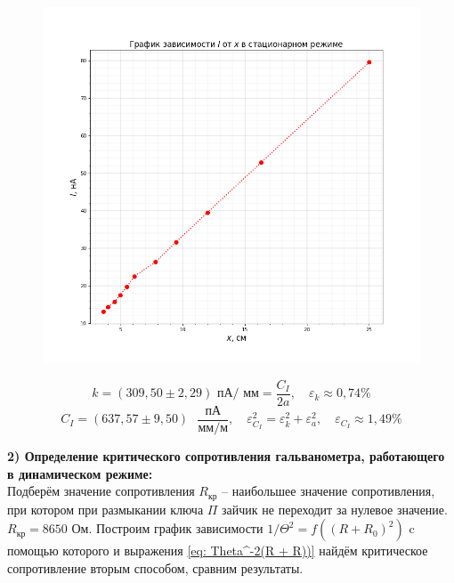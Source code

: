\documentclass[a4paper,12pt]{article}
\begin{document}
\begin{figure}[H]\label{fig: I(x)_DynRejim}
    \centering
    \includegraphics[width = \textwidth]{I(x)_DynRejim.png}
\end{figure}
\[k = (309,50 \pm 2,29) \text{ пА} / \text{ мм}  = \frac{C_I}{2 a}, \quad \varepsilon_k \approx 0,74 \%\]
\[C_I = (637,57 \pm 9,50) \text{ }\frac{пА}{мм / м}, \quad \varepsilon_{C_I}^2 = \varepsilon_k^2 + \varepsilon_a^2, \quad \varepsilon_{C_I} \approx 1,49 \%\]

\textbf{2) Определение критического сопротивления гальванометра, работающего в динамическом режиме:} \\
Подберём значение сопротивления $R_{кр}$ -- наибольшее значение сопротивления, при котором при размыкании ключа $\Pi$ зайчик не переходит за нулевое значение. $R_{кр} = 8650$ Ом. Построим график зависимости $1  / \Theta^2 = f((R + R_0)^2)$ c  помощью которого и выражения \eqref{eq: Theta^-2(R + R))} найдём критическое сопротивление вторым способом, сравним результаты.
\end{document}

